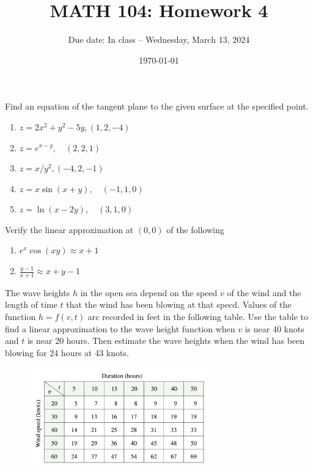 \documentclass[12pt]{amsart}
\title{ MATH 104: Homework 4}
\author{Due date: In class -- Wednesday, March 13, 2024}
\date{\today}
\begin{document}
\maketitle
\begin{problem}
Find an equation of the tangent plane to the given surface at the specified point.

\begin{enumerate}
    \item $z=2 x^2+y^2-5 y,(1,2,-4)$
    \item $z=e^{x-y}, \quad(2,2,1)$
    \item   $z=x / y^2,(-4,2,-1)$
    \item   $z=x \sin (x+y), \quad(-1,1,0)$
    \item   $z=\ln (x-2 y), \quad(3,1,0)$
\end{enumerate}
\end{problem}

\begin{problem}
    Verify the linear approximation at $(0,0)$ of the following
    \begin{enumerate}
        \item $e^x \cos(xy) \approx x + 1 $
        \item $\frac{y-1}{x+1} \approx x + y - 1 $
    \end{enumerate}
\end{problem}

\newpage

\begin{problem}
The wave heights $h$ in the open sea depend on the speed $v$ of the wind and the length of time $t$ that the wind has been blowing at that specd. Values of the function $h=f(v, t)$ arc recorded in feet in the following table. Use the table to find a linear approximation to the wave height function when $v$ is near 40 knots and $t$ is near 20 hours. Then estimate the wave heights when the wind has been blowing for 24 hours at 43 knots.

\begin{figure}[h!]
    \begin{center}
        \includegraphics[width=0.7\textwidth]{wind}
    \end{center}
\end{figure}

\end{problem}
\end{document}
